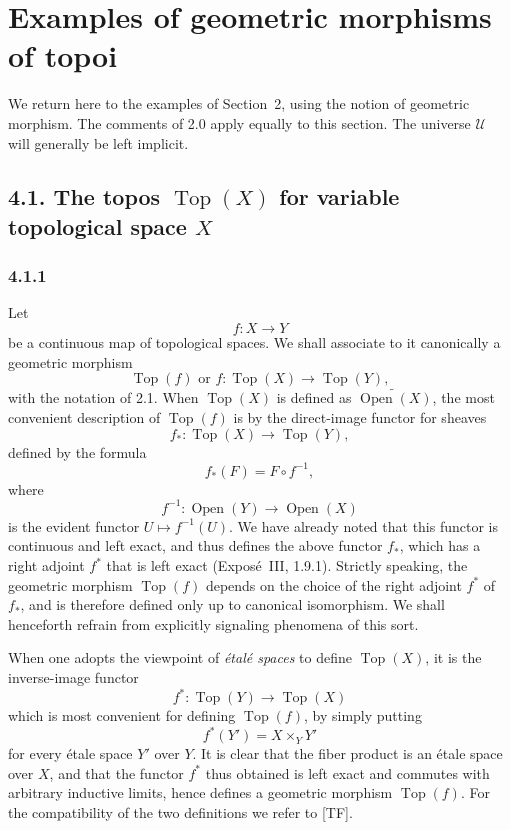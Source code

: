 \documentclass[11pt]{article}
\newcommand{\U}{\mathcal{U}}
\newcommand{\Top}{\operatorname{Top}}
\newcommand{\Open}{\operatorname{Open}}
\begin{document}
\section{Examples of geometric morphisms of topoi}

We return here to the examples of Section~2, using the notion of geometric morphism. The comments of 2.0 apply equally to this section. The universe \(\U\) will generally be left implicit.

\subsection*{4.1. The topos \(\Top(X)\) for variable topological space \(X\)}

\subsubsection*{4.1.1}
Let
\[
f:X\longrightarrow Y
\]
be a continuous map of topological spaces. We shall associate to it canonically a geometric morphism
\[
\Top(f)\text{ or } f:\Top(X)\longrightarrow\Top(Y),
\]
with the notation of 2.1. When \(\Top(X)\) is defined as \(\widetilde{\Open(X)}\), the most convenient description of \(\Top(f)\) is by the direct-image functor for sheaves
\[
f_\ast:\Top(X)\longrightarrow\Top(Y),
\]
defined by the formula
\[
f_\ast(F)=F\circ f^{-1},
\]
where
\[
f^{-1}:\Open(Y)\longrightarrow\Open(X)
\]
is the evident functor \(U\mapsto f^{-1}(U)\). We have already noted that this functor is continuous and left exact, and thus defines the above functor \(f_\ast\), which has a right adjoint \(f^\ast\) that is left exact (Expos\'e~III, 1.9.1). Strictly speaking, the geometric morphism \(\Top(f)\) depends on the choice of the right adjoint \(f^\ast\) of \(f_\ast\), and is therefore defined only up to canonical isomorphism. We shall henceforth refrain from explicitly signaling phenomena of this sort.

When one adopts the viewpoint of \emph{\'etal\'e spaces} to define \(\Top(X)\), it is the inverse-image functor
\[
f^\ast:\Top(Y)\longrightarrow\Top(X)
\]
which is most convenient for defining \(\Top(f)\), by simply putting
\[
f^\ast(Y')=X\times_YY'
\]
for every \'etale space \(Y'\) over \(Y\). It is clear that the fiber product is an \'etale space over \(X\), and that the functor \(f^\ast\) thus obtained is left exact and commutes with arbitrary inductive limits, hence defines a geometric morphism \(\Top(f)\). For the compatibility of the two definitions we refer to [TF].
\end{document}
